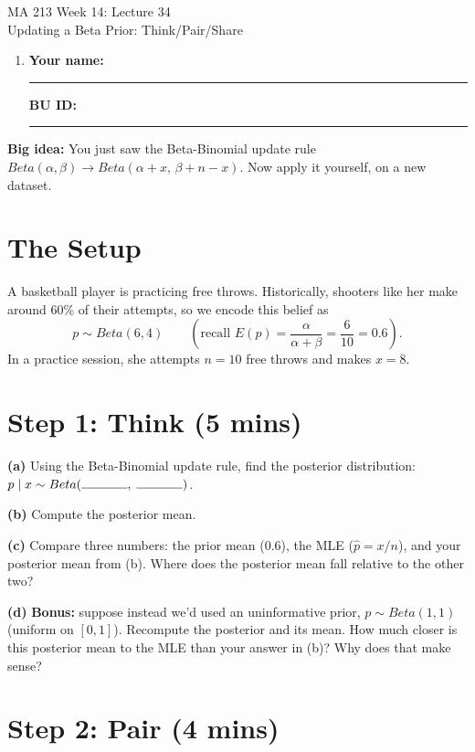 \documentclass{article}
\newcommand{\coursenumber}{MA 213}
\newcommand{\weekplaceholder}{14}
\newcommand{\lectureplaceholder}{34}
\newcommand{\lecturetitle}{Updating a Beta Prior: Think/Pair/Share}
\newcommand{\nameblank}{\rule{1.75in}{0.4pt}}
\newcommand{\idblank}{\rule{1.55in}{0.4pt}}
\begin{document}
\begin{center}
  {\LARGE \coursenumber{} Week \weekplaceholder{}: Lecture \lectureplaceholder{}}\\
  {\large \lecturetitle{}}
\end{center}

\begin{enumerate}[label=\arabic*.,leftmargin=*,itemsep=.7em]
  \item \textbf{Your name:} \nameblank \hfill \textbf{BU ID:} \idblank
\end{enumerate}

\textbf{Big idea:} You just saw the Beta-Binomial update rule $Beta(\alpha,\beta) \to Beta(\alpha+x,\,\beta+n-x)$. Now apply it yourself, on a new dataset.

\section*{The Setup}

A basketball player is practicing free throws. Historically, shooters like her make around 60\% of their attempts, so we encode this belief as
\[
p \sim Beta(6,4) \qquad \left(\text{recall } E(p) = \frac{\alpha}{\alpha+\beta} = \frac{6}{10} = 0.6\right).
\]
In a practice session, she attempts $n=10$ free throws and makes $x=8$.

\section*{Step 1: Think (5 mins)}

\textbf{(a)} Using the Beta-Binomial update rule, find the posterior distribution: $p \mid x \sim Beta(\rule{0.5in}{0.4pt},\;\rule{0.5in}{0.4pt})$.

\textbf{(b)} Compute the posterior mean.
\vspace{0.6in}

\textbf{(c)} Compare three numbers: the prior mean (0.6), the MLE ($\hat{p}=x/n$), and your posterior mean from (b). Where does the posterior mean fall relative to the other two?
\vspace{0.8in}

\textbf{(d)} \textbf{Bonus:} suppose instead we'd used an uninformative prior, $p\sim Beta(1,1)$ (uniform on $[0,1]$). Recompute the posterior and its mean. How much closer is this posterior mean to the MLE than your answer in (b)? Why does that make sense?
\vspace{0.8in}

\newpage
\section*{Step 2: Pair (4 mins)}
\end{document}
